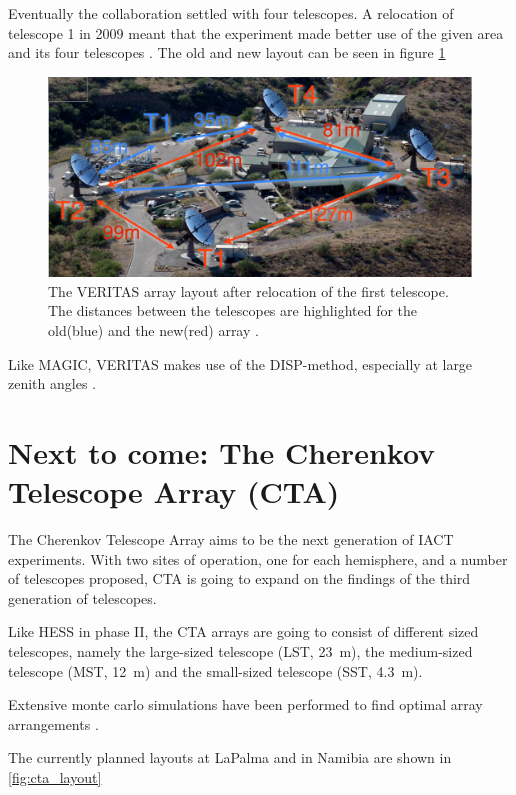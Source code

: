 Eventually the collaboration settled 
with four telescopes. A relocation of telescope 1 in 2009 meant that the 
experiment made better use of the given area and its four telescopes \cite{2009arXiv0912.3841P}.
The old and new layout can be seen in figure \ref{fig:veritas_relocation}

\begin{figure}
	\center
	\includegraphics[width=.8\textwidth]{images/veritas_relocation.png}
	\caption{The VERITAS array layout after relocation of the first 
		telescope. The distances between the telescopes are 
	highlighted for the old(blue) and the new(red) array \cite{2009arXiv0912.3841P}.}
	\label{fig:veritas_relocation}
\end{figure}

Like MAGIC, VERITAS makes use of the DISP-method, especially at large zenith angles 
\cite{2015ICRC...34..771P}.



\section{Next to come: The Cherenkov Telescope Array (CTA)}
\label{sec:cta}

The Cherenkov Telescope Array aims to be the next generation of IACT experiments.
With two sites of operation, one for each hemisphere, and a number of 
telescopes proposed, CTA is going to expand on the findings of the third 
generation of telescopes.

Like HESS in phase II, the CTA arrays are going to consist of different sized telescopes, namely
the large-sized telescope (LST, \SI{23}{\meter}), 
the medium-sized telescope (MST, \SI{12}{\meter}) 
and the small-sized telescope (SST, \SI{4.3}{\meter}).

Extensive monte carlo simulations have been performed to find optimal array arrangements
\cite{BERNLOHR2013171}.

The currently planned layouts at LaPalma and in Namibia are shown in 
\ref{fig:cta_layout}

